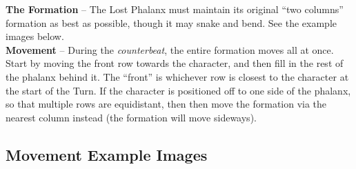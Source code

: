 \textbf{The Formation} -- The Lost Phalanx must maintain its original “two columns” formation as best as possible, though it may snake and bend. See the example images below.\\

\textbf{Movement} -- During the \emph{counterbeat}, the entire formation moves all at once. Start by moving the front row towards the character, and then fill in the rest of the phalanx behind it. The “front” is whichever row is closest to the character at the start of the Turn. If the character is positioned off to one side of the phalanx, so that multiple rows are equidistant, then then move the formation via the nearest column instead (the formation will move sideways).

\subsection*{Movement Example Images}
